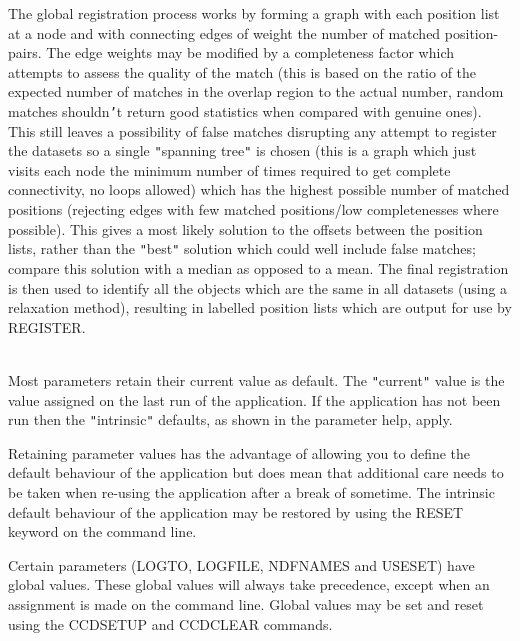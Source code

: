 \documentclass[twoside,11pt]{article}
\newcommand{\htmlref}[2]{#1}
\renewcommand{\_}{\texttt{\symbol{95}}}
\newcommand{\qt}[1]{{\tt "}#1{\tt "}}
\newcommand{\xroutine}[1]{\htmlref{{\sc #1}}{#1}}
\newcommand{\sstdiytopic}[2]{\item[#1:] \mbox{} \\[1.3ex] #2}
\newcommand{\sstdiytopic}[2]{\item[{#1:}] #2 }
\begin{document}
{{      The global registration process works by forming a graph with
      each position list at a node and with connecting edges of weight
      the number of matched position-pairs. The edge weights may be
      modified by a completeness factor which attempts to assess the
      quality of the match (this is based on the ratio of the expected
      number of matches in the overlap region to the actual number,
      random matches shouldn{\tt '}t return good statistics when compared
      with genuine ones). This still leaves a possibility of false
      matches disrupting any attempt to register the datasets so a
      single {\tt "}spanning tree{\tt "} is chosen (this is a graph which just
      visits each node the minimum number of times required to get
      complete connectivity, no loops allowed) which has the highest
      possible number of matched positions (rejecting edges with few
      matched positions/low completenesses where possible). This gives
      a most likely solution to the offsets between the position lists,
      rather than the {\tt "}best{\tt "} solution which could well include false
      matches; compare this solution with a median as opposed to a
      mean. The final registration is then used to identify all the
      objects which are the same in all datasets (using a relaxation
      method), resulting in labelled position lists which are output
      for use by \xroutine{REGISTER}.
   }
   \sstdiytopic{
      Behaviour of parameters
   } {
      Most parameters retain their current value as default. The
      \qt{current} value is the value assigned on the last run of the
      application. If the application has not been run then the
      \qt{intrinsic} defaults, as shown in the parameter help, apply.

      Retaining parameter values has the advantage of allowing you to
      define the default behaviour of the application but does mean
      that additional care needs to be taken when re-using the
      application after a break of sometime. The intrinsic default
      behaviour of the application may be restored by using the RESET
      keyword on the command line.

      Certain parameters (LOGTO, LOGFILE, NDFNAMES and USESET) have global
      values. These global values will always take precedence, except
      when an assignment is made on the command line.  Global values may
      be set and reset using the \xroutine{CCDSETUP} and \xroutine{CCDCLEAR} commands.
   }
}
\end{document}
